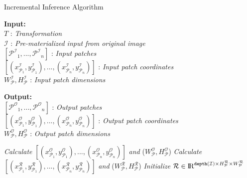 \begin{algorithm}
    \caption{Incremental Inference Algorithm}\label{euclid}
    \label{alg:incinference}
    \begin{flushleft}
     \hspace*{4mm} \textbf{Input:} \\
     \hspace*{8mm} $T$ : \textit{Transformation}\\
     \hspace*{8mm} $\mathcal{I}$ : \textit{Pre-materialized input from original image}\\
     \hspace*{8mm} $[\mathcal{P^I}_1,...,\mathcal{P^I}_n]$ : \textit{Input patches}\\
     \hspace*{8mm} $[(x^\mathcal{I}_{\mathcal{P}_1},y^\mathcal{I}_{\mathcal{P}_1}),...,(x^\mathcal{I}_{\mathcal{P}_n},y^\mathcal{I}_{\mathcal{P}_n})]$ : \textit{Input patch coordinates}\\
     \hspace*{8mm} $W^\mathcal{I}_\mathcal{P},H^\mathcal{I}_\mathcal{P}$ : \textit{Input patch dimensions}
    \end{flushleft}

	\begin{flushleft}
     \hspace*{4mm} \textbf{Output:}\\
     \hspace*{8mm} $[\mathcal{P^O}_1,...,\mathcal{P^O}_n]$ : \textit{Output patches}\\
     \hspace*{8mm} $[(x^\mathcal{O}_{\mathcal{P}_1},y^\mathcal{O}_{\mathcal{P}_1}),...,(x^\mathcal{O}_{\mathcal{P}_n},y^\mathcal{O}_{\mathcal{P}_n})]$ : \textit{Output patch coordinates}\\
     \hspace*{8mm} $W^\mathcal{O}_\mathcal{P},H^\mathcal{O}_\mathcal{P}$ : \textit{Output patch dimensions}
    \end{flushleft}

    \begin{algorithmic}[1]
    \State \textit{Calculate} $[(x^\mathcal{O}_{\mathcal{P}_1},y^\mathcal{O}_{\mathcal{P}_1}),...,(x^\mathcal{O}_{\mathcal{P}_n},y^\mathcal{O}_{\mathcal{P}_n})]$ \textit{and} ($W^\mathcal{O}_\mathcal{P},H^\mathcal{O}_\mathcal{P}$)
    \State \textit{Calculate} $[(x^\mathcal{R}_{\mathcal{P}_1},y^\mathcal{R}_{\mathcal{P}_1}),...,(x^\mathcal{R}_{\mathcal{P}_n},y^\mathcal{R}_{\mathcal{P}_n})]$ \textit{and} ($W^\mathcal{R}_\mathcal{P},H^\mathcal{R}_\mathcal{P}$)
    \State \textit{Initialize} $\mathcal{R} \in \mathcal{\rm I\!R}^{\texttt{depth}(\mathcal{I}) \times H^\mathcal{R}_\mathcal{P} \times W^\mathcal{R}_\mathcal{P}}$


\end{algorithmic}
\end{algorithm}
